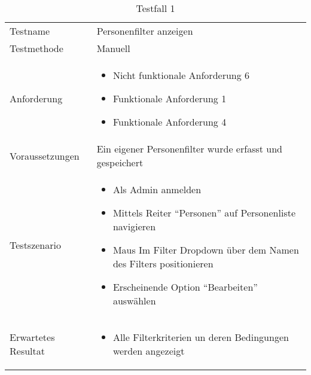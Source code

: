 \begin{table}[h!]
   \begin{tabular}{|L{0.4\textwidth}|L{0.6\textwidth}|}
       \hline
         \\[12pt]
       \hline
        Testname & Personenfilter anzeigen \\
       \hline
       Testmethode & Manuell \\
       \hline
        Anforderung & \begin{itemize}
         \item Nicht funktionale Anforderung 6
         \item Funktionale Anforderung 1
         \item Funktionale Anforderung 4
         \end{itemize}  \\
       \hline
       Voraussetzungen & Ein eigener Personenfilter wurde erfasst und gespeichert \\
       \hline
       Testszenario & 
       \begin{itemize}
         \item Als Admin anmelden
         \item Mittels Reiter ``Personen'' auf Personenliste navigieren
         \item Maus Im Filter Dropdown über dem Namen des Filters positionieren
         \item Erscheinende Option ``Bearbeiten'' auswählen
       \end{itemize} \\
       \hline
       Erwartetes Resultat & 
       \begin{itemize}
         \item Alle Filterkriterien un deren Bedingungen werden angezeigt
      \end{itemize} \\
      \hline
     \end{tabular}
     \caption{Testfall 1}
\end{table}

\newpage

